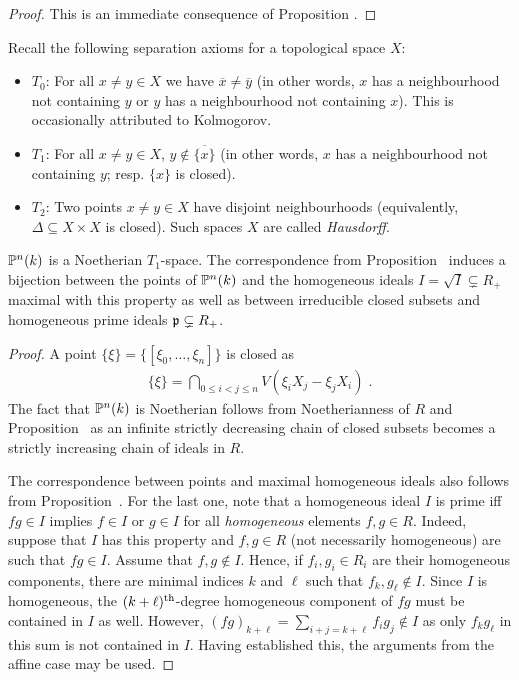 \documentclass[a4paper,parskip=half,numbers=enddot, DIV=12]{scrreprt}
\begin{document}
\begin{proof}
	This is an immediate consequence of Proposition .
\end{proof}
\begin{rem*}Recall the following separation axioms for a topological space $X$:
\begin{itemize}
\item $T_0$:
For all $x\neq y\in X$ we have $\overline x\neq\overline y$ (in other words, $x$ has a neighbourhood
not containing $y$ or $y$ has a neighbourhood not containing $x$). This is occasionally attributed to Kolmogorov.
\item $T_1$: For all $x\neq y\in X$, $y\notin\overline{\{ x\}}$ (in other words, $x$ has a neighbourhood not containing $y$;
resp. $\{x\}$ is closed).
\item $T_2$: Two points $x\neq y\in X$ have disjoint neighbourhoods (equivalently, $\Delta\subseteq X\times X$ is closed). Such spaces $X$ are called \emph{Hausdorff}.
\end{itemize}
\end{rem*}
\begin{prop}
$\mathbb{P}^n(k)$ is a Noetherian $T_1$-space. The correspondence from  Proposition~ induces a bijection between the points of $\mathbb{P}^n(k)$ and the homogeneous
ideals $I=\sqrt I\subsetneq R_+$ maximal with this property as well as between irreducible closed subsets and homogeneous prime ideals $\mathfrak{p}\subsetneq R_+$.
\end{prop}
\begin{proof}
A point $\{\xi\} = \{[\xi_0,\ldots,\xi_n]\}$ is closed as 
\begin{align*}
	\{\xi\}=\bigcap_{0\leq i<j\leq n} V( \xi_i X_j - \xi_j X_i)\;.
\end{align*}
The fact that $\mathbb{P}^n(k)$ is Noetherian follows from Noetherianness of $R$ and Proposition~
as an infinite strictly decreasing chain of closed subsets becomes a strictly increasing chain of ideals in $R$.

The correspondence between points and maximal homogeneous ideals also follows from Proposition~. For the last one, note that a homogeneous ideal $I$ is prime iff $fg\in I$ implies $f\in I$ or $g\in I$ for all \emph{homogeneous} elements $f,g\in R$. Indeed, suppose that $I$ has this property and $f,g\in R$ (not necessarily homogeneous) are such that $fg\in I$. Assume that $f,g\notin I$. Hence, if $f_i,g_i\in R_i$ are their homogeneous components, there are minimal indices $k$ and $\ell$ such that $f_k,g_\ell\notin I$. Since $I$ is homogeneous, the $(k+\ell)^{\text{th}}$-degree homogeneous component of $fg$ must be contained in $I$ as well. However, $(fg)_{k+\ell}=\sum_{i+j=k+\ell}f_ig_j\notin I$ as only $f_kg_\ell$ in this sum is not contained in $I$. Having established this, the arguments from the affine case may be used.
\end{proof}
\end{document}

